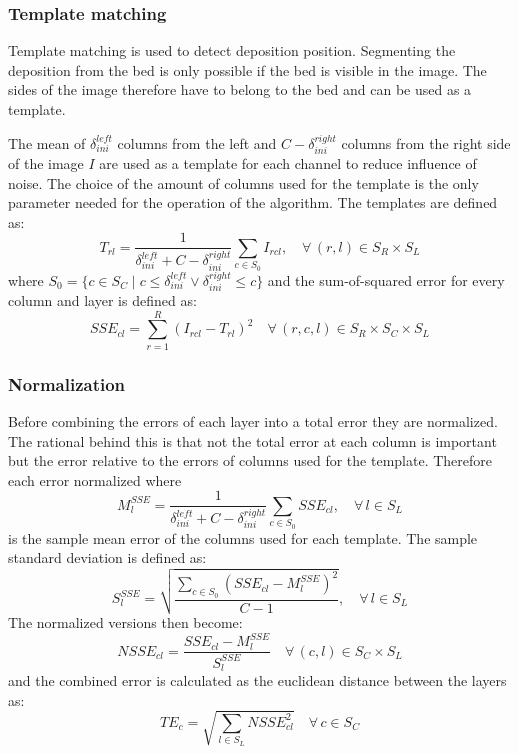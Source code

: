 \documentclass[10pt,letter]{article}
\begin{document}
\subsubsection{Template matching}
Template matching is used to detect deposition position. Segmenting the deposition from the bed is only possible if the bed is visible in the image. The sides of the image therefore have to belong to the bed and can be used as a template. 

The mean of $\delta^{left}_{ini}$ columns from the left and $C-\delta^{right}_{ini}$ columns from the right side of the image $I$ are used as a template for each channel to reduce influence of noise. The choice of the amount of columns used for the template is the only parameter needed for the operation of the algorithm. The templates are defined as:
\begin{equation}
T_{rl} = \frac{1}{\delta^{left}_{ini}+C-\delta^{right}_{ini}}  \sum_{c \in S_0}  I_{rcl}, \quad \forall \, (r,l) \in S_R \times S_L
\end{equation}
where $S_0 = \{c \in S_C \mid c \leq \delta^{left}_{ini} \lor \delta^{right}_{ini} \leq c \}$ 
and the sum-of-squared error for every column and layer is defined as:
\begin{equation}
SSE_{cl} = \sum^{R}_{r=1} \left( I_{rcl} - T_{rl} \right)^2 \quad \forall \, (r,c,l) \in S_R \times S_C \times S_L
\end{equation}

\subsubsection{Normalization}
Before combining the errors of each layer into a total error they are normalized. The rational behind this is that not the total error at each column is important but the error relative to the errors of columns used for the template. Therefore each error normalized where
\begin{equation}
M^{SSE}_l = \frac{1}{\delta^{left}_{ini}+C-\delta^{right}_{ini}} \sum_{c \in S_0}  SSE_{cl}, \quad \forall \, l \in S_L
\end{equation}
is the sample mean error of the columns used for each template. The sample standard deviation is defined as:
\begin{equation}
S^{SSE}_l = \sqrt{\frac{\sum_{c \in S_0} ( SSE_{cl} - M^{SSE}_l )^2}{C-1}}, \quad \forall \, l \in S_L
\end{equation}
The normalized versions then become:
\begin{equation}
NSSE_{cl} = \frac{SSE_{cl}-M^{SSE}_l}{S^{SSE}_l} \quad \forall \, (c,l) \in S_C \times S_L
\end{equation}
and the combined error is calculated as the euclidean distance between the layers as:
\begin{equation}
TE_{c} = \sqrt{ \sum_{l \in S_L} NSSE_{cl}^2} \quad \forall \, c \in S_C
\end{equation}
\end{document}
